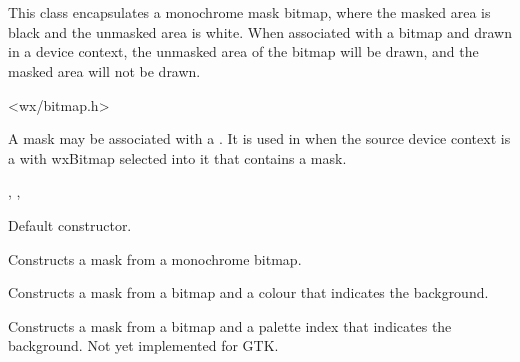\section{}\label{wxmask}

This class encapsulates a monochrome mask bitmap, where the masked area is black and
the unmasked area is white. When associated with a bitmap and drawn in a device context,
the unmasked area of the bitmap will be drawn, and the masked area will not be drawn.




<wx/bitmap.h>


A mask may be associated with a . It is used in  when
the source device context is a  with wxBitmap selected into it that
contains a mask.


, , 


\label{wxmaskctor}


Default constructor.


Constructs a mask from a monochrome bitmap.



Constructs a mask from a bitmap and a colour that indicates the background.



Constructs a mask from a bitmap and a palette index that indicates the background. Not
yet implemented for GTK.

